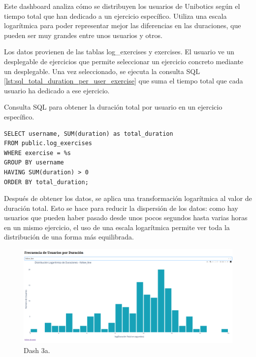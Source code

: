 \documentclass[a4paper, 12pt]{book}
\begin{document}
Este dashboard analiza cómo se distribuyen los usuarios de Unibotics según el tiempo total que han dedicado a un ejercicio específico. Utiliza una escala logarítmica para poder representar mejor las diferencias en las duraciones, que pueden ser muy grandes entre unos usuarios y otros.

Los datos provienen de las tablas log\_exercises y exercises. El usuario ve un desplegable de ejercicios que permite seleccionar un ejercicio concreto mediante un desplegable. Una vez seleccionado, se ejecuta la consulta SQL \ref{lst:sql_total_duration_per_user_exercise} que suma el tiempo total que cada usuario ha dedicado a ese ejercicio.

\begin{listing}[h!]
    \caption{Consulta SQL para obtener la duración total por usuario en un ejercicio específico.}{}
    \label{lst:sql_total_duration_per_user_exercise}
    \begin{verbatim}
SELECT username, SUM(duration) as total_duration
FROM public.log_exercises
WHERE exercise = %s
GROUP BY username
HAVING SUM(duration) > 0
ORDER BY total_duration;
    \end{verbatim}
\end{listing}

Después de obtener los datos, se aplica una transformación logarítmica al valor de duración total. Esto se hace para reducir la dispersión de los datos: como hay usuarios que pueden haber pasado desde unos pocos segundos hasta varias horas en un mismo ejercicio, el uso de una escala logarítmica permite ver toda la distribución de una forma más equilibrada.

\begin{figure}
  \centering
  \includegraphics[width=1.1\textwidth]{img/3a.png}
  \caption{Dash 3a.}\label{fig:3a}
\end{figure}
\end{document}
